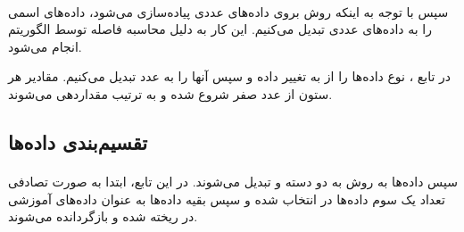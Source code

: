 \documentclass[a4paper,12pt]{article}
\begin{document}
\begin{flushleft}
\end{flushleft}

\paragraph{}
سپس با توجه به اینکه روش  بروی داده‌های عددی پیاده‌سازی می‌شود، داده‌های اسمی را به داده‌های عددی تبدیل می‌کنیم. این کار به دلیل محاسبه فاصله توسط الگوریتم  انجام می‌شود.


در تابع ، نوع داده‌ها را از  به  تغییر داده و سپس آنها را به عدد تبدیل می‌کنیم. مقادیر هر ستون از عدد صفر شروع شده و به ترتیب مقداردهی می‌شوند.

\begin{flushleft}
\end{flushleft}

\subsection{تقسیم‌بندی داده‌ها}	
\paragraph{}
سپس داده‌ها به روش  به دو دسته  و  تبدیل می‌شوند. در این تابع، ابتدا به صورت تصادفی تعداد یک سوم داده‌ها در  انتخاب شده و سپس بقیه داده‌ها به عنوان داده‌های آموزشی در  ریخته شده و بازگردانده می‌شوند.
\begin{flushleft}
\end{flushleft}
\end{document}
